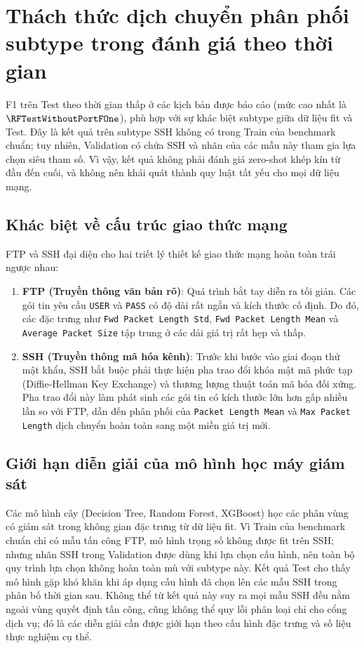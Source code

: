 
\section{Thách thức dịch chuyển phân phối subtype trong đánh giá theo thời gian}

F1 trên Test theo thời gian thấp ở các kịch bản được báo cáo (mức cao nhất là $\RFTestWithoutPortFOne$), phù hợp với sự khác biệt subtype giữa dữ liệu fit và Test. Đây là kết quả trên subtype SSH không có trong Train của benchmark chuẩn; tuy nhiên, Validation có chứa SSH và nhãn của các mẫu này tham gia lựa chọn siêu tham số. Vì vậy, kết quả không phải đánh giá zero-shot khép kín từ đầu đến cuối, và không nên khái quát thành quy luật tất yếu cho mọi dữ liệu mạng.

\subsection{Khác biệt về cấu trúc giao thức mạng}
FTP và SSH đại diện cho hai triết lý thiết kế giao thức mạng hoàn toàn trái ngược nhau:
\begin{enumerate}
    \item \textbf{FTP (Truyền thông văn bản rõ)}: Quá trình bắt tay diễn ra tối giản. Các gói tin yêu cầu \texttt{USER} và \texttt{PASS} có độ dài rất ngắn và kích thước cố định. Do đó, các đặc trưng như \texttt{Fwd Packet Length Std}, \texttt{Fwd Packet Length Mean} và \texttt{Average Packet Size} tập trung ở các dải giá trị rất hẹp và thấp.
    \item \textbf{SSH (Truyền thông mã hóa kênh)}: Trước khi bước vào giai đoạn thử mật khẩu, SSH bắt buộc phải thực hiện pha trao đổi khóa mật mã phức tạp (Diffie-Hellman Key Exchange) và thương lượng thuật toán mã hóa đối xứng. Pha trao đổi này làm phát sinh các gói tin có kích thước lớn hơn gấp nhiều lần so với FTP, dẫn đến phân phối của \texttt{Packet Length Mean} và \texttt{Max Packet Length} dịch chuyển hoàn toàn sang một miền giá trị mới.
\end{enumerate}

\subsection{Giới hạn diễn giải của mô hình học máy giám sát}
Các mô hình cây (Decision Tree, Random Forest, XGBoost) học các phân vùng có giám sát trong không gian đặc trưng từ dữ liệu fit. Vì Train của benchmark chuẩn chỉ có mẫu tấn công FTP, mô hình trọng số không được fit trên SSH; nhưng nhãn SSH trong Validation được dùng khi lựa chọn cấu hình, nên toàn bộ quy trình lựa chọn không hoàn toàn mù với subtype này. Kết quả Test cho thấy mô hình gặp khó khăn khi áp dụng cấu hình đã chọn lên các mẫu SSH trong phân bố thời gian sau. Không thể từ kết quả này suy ra mọi mẫu SSH đều nằm ngoài vùng quyết định tấn công, cũng không thể quy lỗi phân loại chỉ cho cổng dịch vụ; đó là các diễn giải cần được giới hạn theo cấu hình đặc trưng và số liệu thực nghiệm cụ thể.
